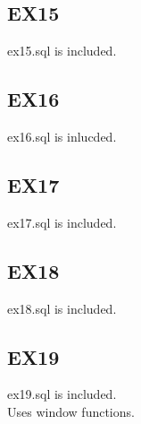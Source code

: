 \documentclass{article}
\begin{document}
\subsection{EX15}
ex15.sql is included.\\

\subsection{EX16}
ex16.sql is inlucded.\\

\subsection{EX17}
ex17.sql is included.\\

\subsection{EX18}
ex18.sql is included.\\

\subsection{EX19}
ex19.sql is included.\\
Uses window functions.\\
\end{document}
